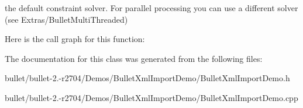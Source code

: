 the default constraint solver. For parallel processing you can use a different solver (see Extras/\+Bullet\+Multi\+Threaded) 

Here is the call graph for this function\+:




The documentation for this class was generated from the following files\+:\begin{DoxyCompactItemize}
\item 
bullet/bullet-\/2.-\/r2704/\+Demos/\+Bullet\+Xml\+Import\+Demo/Bullet\+Xml\+Import\+Demo.\+h\item 
bullet/bullet-\/2.-\/r2704/\+Demos/\+Bullet\+Xml\+Import\+Demo/Bullet\+Xml\+Import\+Demo.\+cpp\end{DoxyCompactItemize}
